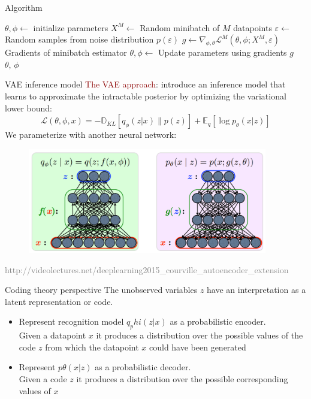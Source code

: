 \documentclass[unicode,11pt]{beamer}
\begin{document}
\begin{frame}[fragile]{Algorithm}
  \begin{algorithmic}
    \State $\theta, \phi \gets$ initialize parameters
    \Repeat 
       \State $X^M \gets$ Random minibatch of $M$ datapoints 
       \State $\varepsilon \gets$ Random samples from noise distribution $p(\varepsilon)$
       \State $g \gets \nabla_{\phi, \theta} \mathcal{L}^M(\theta, \phi; X^M, \varepsilon) $ Gradients of minibatch estimator
       \State $\theta, \phi \gets$ Update parameters using gradients $g$
    \\
    \Return $\theta$, $\phi$
  \end{algorithmic}
  
\end{frame}

\begin{frame}[fragile]{VAE inference model}
\textcolor{darkred}{The VAE approach}: introduce an inference model that
learns to approximate the intractable posterior by
optimizing the variational lower bound: 
$$ \mathcal{L}(\theta, \phi, x) = -\mathbb{D}_{KL}[q_{\phi} (z|x) \parallel p(z)] + \mathbb{E}_q [\log p_\theta (x|z)] $$
We parameterize with another neural network:
\begin{figure}[htbp]
  \includegraphics[height=130pt, keepaspectratio = true]{images/vae}   
\end{figure}
\tiny \textcolor{gray}{http://videolectures.net/deeplearning2015\_courville\_autoencoder\_extension}
\end{frame}

\begin{frame}[fragile]{Coding theory perspective}
The unobserved variables $z$ have an interpretation as a latent representation or code.

\begin{itemize}
  \item Represent recognition model $q_phi(z|x)$ as a probabilistic encoder.\\
        Given a datapoint $x$ it produces a distribution over the possible values of the code $z$ from which the datapoint $x$ could have been generated
  \item Represent $p\theta(x|z)$ as a probabilistic decoder.\\
        Given a code $z$ it produces a distribution over the possible corresponding values of $x$
\end{itemize}
\end{frame}
\end{document}
